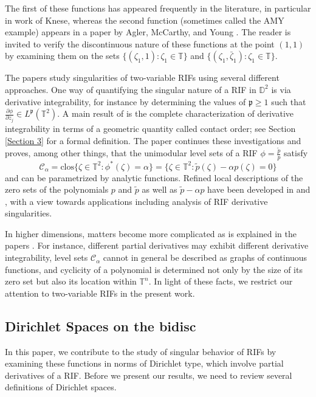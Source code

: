 \documentclass[11pt]{amsart}
\numberwithin{equation}{section}
\begin{document}
The first of these functions has appeared frequently in the literature, in particular in work of Knese, whereas the second function (sometimes called the AMY example) appears in a paper by Agler, McCarthy, and Young \cite{AMY}. The reader is invited to verify the discontinuous nature of these functions at the point $(1,1)$ by examining them on the sets $\{(\zeta_1,1)\colon \zeta_1 \in \mathbb{T}\}$ and $\{(\zeta_1,\bar{\zeta}_1)\colon \zeta_1\in \mathbb{T}\}$. 

The papers \cite{PLMS,Pisa} study singularities of two-variable RIFs using several different approaches. One way of quantifying the singular nature of a RIF in $\mathbb{D}^2$ is via derivative integrability, for instance by determining the values of $\mathfrak{p}\geq 1$ such that $\frac{\partial \phi}{\partial z_j} \in L^{\mathfrak{p}}(\mathbb{T}^2)$. A main result of \cite{PLMS} is the complete characterization of derivative integrability in terms of a geometric quantity called contact order; see Section \ref{Section 3} for a formal definition. The paper \cite{Pisa} continues these investigations and proves, among other things, that the unimodular level sets of a RIF $\phi=\frac{\tilde{p}}{p}$ satisfy
\[\mathcal{C}_{\alpha}=\mathrm{clos}\{\zeta \in \mathbb{T}^2\colon \phi^{*}(\zeta)=\alpha\}=\{\zeta \in \mathbb{T}^2\colon \tilde{p}(\zeta)-\alpha p(\zeta)=0\}\] 
and can be parametrized by analytic functions. Refined local descriptions of the zero sets of the polynomials $p$ and $\tilde{p}$ as well as $\tilde{p}-\alpha p$ have been developed in \cite{Polonici} and \cite{TAMSKNESE}, with a view towards applications including analysis of RIF derivative singularities.

In higher dimensions, matters become more complicated as is explained in the papers \cite{AJM,Bergqvist}. For instance, different partial derivatives may exhibit different derivative integrability, level sets $\mathcal{C}_{\alpha}$ cannot in general be described as graphs of continuous functions, and cyclicity of a polynomial is determined not only by the size of its zero set but also its location within $\mathbb{T}^n.$ In light of these facts, we restrict our attention to two-variable RIFs in the present work.

\subsection{Dirichlet Spaces on the bidisc} 
In this paper, we contribute to the study of singular behavior of RIFs by examining these functions in norms of Dirichlet type, which involve partial derivatives of a RIF. Before we present our results, we need to review several definitions of Dirichlet spaces.
\end{document}
